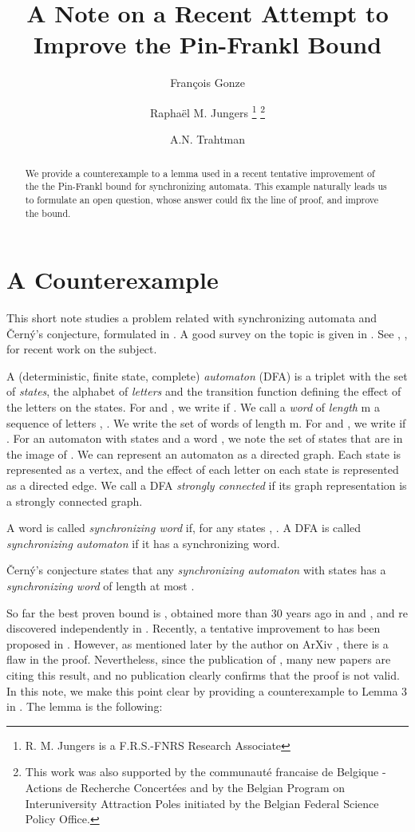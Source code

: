 \documentclass{llncs}
\title{
A Note on a Recent Attempt to Improve the Pin-Frankl Bound
}
\author{Fran\c cois Gonze \inst{1} \and Rapha\"el M. Jungers \inst{1} \thanks{R. M. Jungers is a F.R.S.-FNRS Research Associate}
\thanks{This work was also supported by the communaut\'e francaise de Belgique - Actions de Recherche Concert\'ees and by the Belgian Program on Interuniversity Attraction Poles initiated by the Belgian Federal Science Policy Office.} \and A.N. Trahtman \inst{2}}
\institute{ICTEAM Institute\\
UCLouvain, Louvain La Neuve, Belgium\\
 \email{francois.gonze,raphael.jungers@uclouvain.be}\\
\and 
 Dep. of Math.\\
Bar-Ilan University, 52900, Ramat Gan, Israel\\
 \email{trakht@macs.biu.ac.il} 
 }
\begin{document}
\maketitle
\begin{abstract}

We provide a counterexample to a lemma used in a recent tentative improvement of the the Pin-Frankl bound for synchronizing automata. This example naturally leads us to formulate an open question, whose answer could fix the line of proof, and improve the bound.

\end{abstract}


\section*{A Counterexample}

This short note studies a problem related with synchronizing automata and \v Cern{\'y}'s conjecture, formulated in \cite{Cerny64}.
A good survey on the topic is given in \cite{volkov_survey}. See \cite{JungersBlondelOlshevsky14}, \cite{ArxivPrep}, \cite{jungers_sync_12} for recent work on the subject.

A (deterministic, finite state, complete) \emph{automaton} (DFA) is a triplet  with  the set of \emph{states},  the alphabet of \emph{letters} and  the transition function  defining the effect of the letters on the states. For  and , we write  if . We call a \emph{word}  of \emph{length} m a sequence of  letters , . We write  the set of words of length m. For  and , we write  if . For an automaton with  states and a word , we note  the set of states that are in the image of . We can represent an automaton as a directed graph. Each state is represented as a vertex, and the effect of each letter on each state is represented as a directed edge. We call a DFA \emph{strongly connected} if its graph representation is a strongly connected graph.

A word  is called \emph{synchronizing word} if, for any states , . A DFA is called \emph{synchronizing automaton} if it has a synchronizing word.

\v Cern{\'y}'s conjecture \cite{Cerny64} states that any \emph{synchronizing automaton} with  states has a \emph{synchronizing word} of length at most .

So far the best proven bound is , obtained more than 30 years ago in \cite{Frankl82} and \cite{Pin83a}, and re discovered independently in \cite{KlyachkoRystsovSpivak87}. Recently, a tentative improvement to  has been proposed in  \cite{Trahtman2011}. However, as mentioned later by the author on ArXiv \cite{ArxivPTraht}, there is a flaw in the proof. Nevertheless, since the publication of \cite{Trahtman2011}, many new papers are citing this result, and no publication clearly confirms that the proof is not valid. In this note, we make this point clear by providing a counterexample to Lemma 3 in \cite{Trahtman2011}. The lemma is the following:
\end{document}
